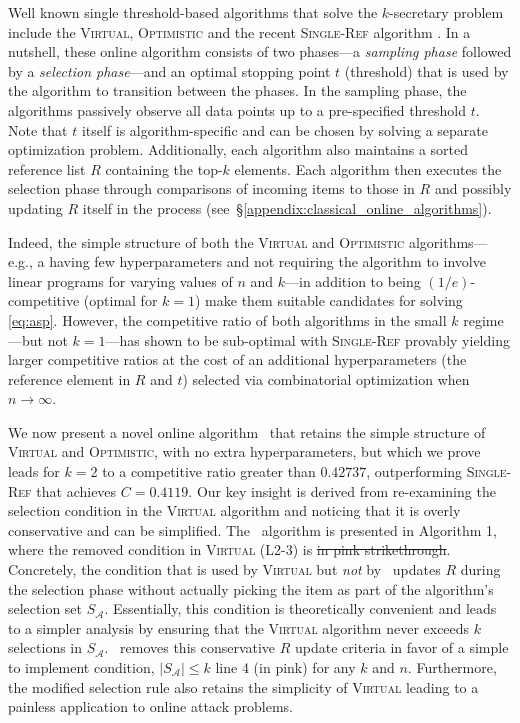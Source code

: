 Well known single threshold-based algorithms that solve the $k$-secretary problem include the \textsc{Virtual}, \textsc{Optimistic} \cite{babaioff2007knapsack} and the recent \textsc{Single-Ref} algorithm \cite{albers2019improved}. In a nutshell, these online algorithm consists of two phases---a \textit{sampling phase} followed by a \textit{selection phase}---and an optimal stopping point $t$ (threshold) that is used by the algorithm to transition between the phases. In the sampling phase, the algorithms passively observe all data points up to a pre-specified threshold $t$. Note that $t$ itself is algorithm-specific and can be chosen by solving a separate optimization problem. Additionally, each algorithm also maintains a sorted reference list $R$ containing the top-$k$ elements. Each algorithm then executes the selection phase through comparisons of incoming items to those in $R$ and possibly updating $R$ itself in the process (see~\S\ref{appendix:classical_online_algorithms}).

Indeed, the simple structure of both the \textsc{Virtual} and \textsc{Optimistic} algorithms---e.g., a having few hyperparameters and not requiring the algorithm to involve linear programs for varying values of $n$ and $k$---in addition to being $(1/e)$-competitive (optimal for $k=1$) make them suitable candidates for solving \eqref{eq:asp}. However, 
the competitive ratio of both algorithms in the small $k$ regime---but not $k=1$---has shown to be sub-optimal with \textsc{Single-Ref} provably yielding larger competitive ratios at the cost of an additional hyperparameters (the reference element in $R$ and $t$) selected via combinatorial optimization when $n \to \infty$. 

We now present a novel online algorithm \algoname\ that retains the simple structure of \textsc{Virtual} and \textsc{Optimistic}, with no extra hyperparameters, but which we prove leads for $k=2$ to a competitive ratio greater than $0.42737$, outperforming \textsc{Single-Ref} that achieves $C=0.4119$. Our key insight is derived from re-examining the selection condition in the \textsc{Virtual} algorithm and noticing that it is overly conservative and can be simplified. The \algoname\ algorithm is presented in Algorithm 1, where the removed condition in \textsc{Virtual} (L2-3) is \st{in pink strikethrough}. Concretely, the condition that is used by \textsc{Virtual} but \emph{not} by \algoname\ updates $R$ during the selection phase without actually picking the item as part of the algorithm's selection set $S_{\mathcal{A}}$. Essentially, this condition is theoretically convenient and leads to a simpler analysis by ensuring that the \textsc{Virtual} algorithm never exceeds $k$ selections in $S_{\mathcal{A}}$. \algoname\ removes this conservative $R$ update criteria in favor of a simple to implement condition, $|S_{\mathcal{A}}| \leq k$ line 4 {\color{salmon}(in pink)} for any $k$ and $n$. Furthermore, the modified selection rule also retains the simplicity of \textsc{Virtual} leading to a painless application to online attack problems.

